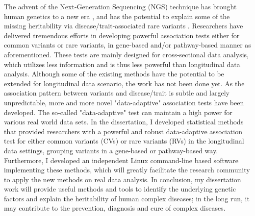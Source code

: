 \documentclass[12pt]{article}
\begin{document}
The advent of the Next-Generation Sequencing (NGS) technique has brought human genetics to a new era \cite{Ansorge2009,Metzker2009,Mardis2008,Shendure2008}, and has the potential to explain some of the missing heritability via disease/trait-associated rare variants \cite{Eichler2010}. Researchers have delivered tremendous efforts in developing powerful association tests either for common variants or rare variants, in gene-based and/or pathway-based manner as aforementioned. These tests are mainly designed for cross-sectional data analysis, which utilizes less information and is thus less powerful than longitudinal data analysis. Although some of the existing methods have the potential to be extended for longitudinal data scenario, the work has not been done yet.
As the association pattern between variants and disease/trait is subtle and largely unpredictable, more and more novel "data-adaptive" association tests have been developed. The so-called "data-adaptive" test can maintain a high power for various real world data sets. In the dissertation, I developed statistical methods that provided researchers with a powerful and robust data-adaptive association test for either common variants (CVs) or rare variants (RVs) in the longitudinal data settings, grouping variants in a gene-based or pathway-based way. Furthermore, I developed an independent Linux command-line based software implementing these methods, which will greatly facilitate the research community to apply the new methods on real data analysis. In conclusion, my dissertation work will provide useful methods and tools to identify the underlying genetic factors and explain the heritability of human complex diseases; in the long run, it may contribute to the prevention, diagnosis and cure of complex diseases.



\end{document}
